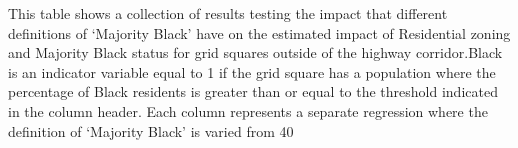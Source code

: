 \begin{table}[h]
\begin{threeparttable}
\begin{tablenotes}[flushleft]
\item This table shows a collection of results testing the impact that different definitions of `Majority Black' have on the estimated impact of Residential zoning and Majority Black status for grid squares outside of the highway corridor.Black is an indicator variable equal to 1 if the grid square has a population where the percentage of Black residents is greater than or equal to the threshold indicated in the column header. Each column represents a separate regression where the definition of `Majority Black' is varied from 40%
\end{tablenotes}
\end{threeparttable}
\end{table}

